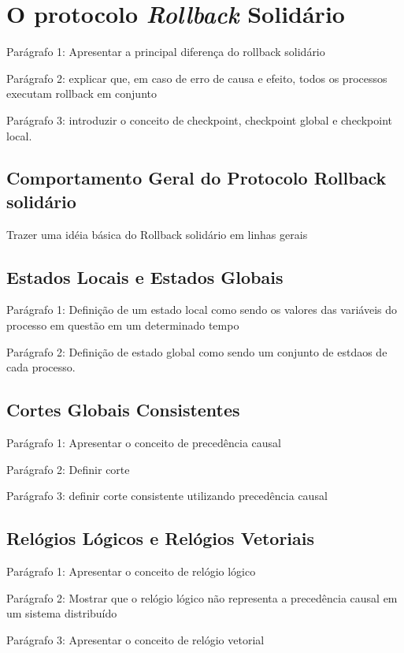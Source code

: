 \section{O protocolo \textit{Rollback} Solidário}

Parágrafo 1: Apresentar a principal diferença do rollback solidário

Parágrafo 2: explicar que, em caso de erro de causa e efeito, todos os processos executam rollback em conjunto

Parágrafo 3: introduzir o conceito de checkpoint, checkpoint global e checkpoint local.

\subsection{Comportamento Geral do Protocolo Rollback solidário}

Trazer uma idéia básica do Rollback solidário em linhas gerais

\subsection{Estados Locais e Estados Globais}

Parágrafo 1: Definição de um estado local como sendo os valores das variáveis do processo em questão em um determinado tempo

Parágrafo 2: Definição de estado global como sendo um conjunto de estdaos de cada processo.

\subsection{Cortes Globais Consistentes}

Parágrafo 1: Apresentar o conceito de precedência causal

Parágrafo 2: Definir corte 

Parágrafo 3: definir corte consistente utilizando precedência causal

\subsection{Relógios Lógicos e Relógios Vetoriais}

Parágrafo 1: Apresentar o conceito de relógio lógico

Parágrafo 2: Mostrar que o relógio lógico não representa a precedência causal em um sistema distribuído

Parágrafo 3: Apresentar o conceito de relógio vetorial

